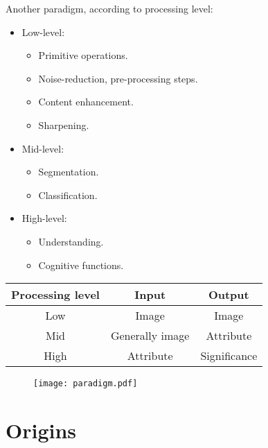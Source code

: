 \begin{frame}
Another paradigm, according to processing level:
\begin{itemize}
\item Low-level:
\begin{itemize}
\item Primitive operations.
\item Noise-reduction, pre-processing steps.
\item Content enhancement.
\item Sharpening.
\end{itemize}
\item Mid-level:
\begin{itemize}
\item Segmentation.
\item Classification.
\end{itemize}
\end{itemize}
\end{frame}


\begin{frame}
\begin{itemize}
\item High-level:
\begin{itemize}
\item Understanding.
\item Cognitive functions.
\end{itemize}
\end{itemize}
\begin{table}
\centering
\begin{tabular}{|c|c|c|}
\hline 
Processing level & Input & Output \\ 
\hline 
\hline
Low & Image & Image \\ 
\hline 
Mid & Generally image & Attribute \\ 
\hline 
High & Attribute & Significance \\ 
\hline 
\end{tabular} 
\end{table}
\begin{figure}
\texttt{[image: paradigm.pdf]}
\end{figure}
\end{frame}

\section{Origins}

